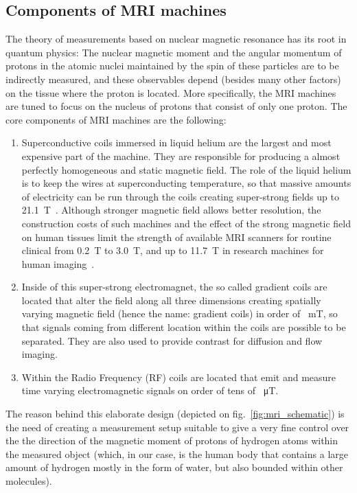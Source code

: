 \subsection{Components of MRI machines}
The theory of measurements based on nuclear magnetic resonance has its root in quantum physics: The nuclear magnetic moment and the angular momentum of protons in the atomic nuclei maintained by the spin of these particles are to be indirectly measured, and these observables depend (besides many other factors) on the tissue where the proton is located. More specifically, the MRI
machines are tuned to focus on the nucleus of protons that consist of only one proton. The core components of MRI machines are the following:
\begin{enumerate}
    \item Superconductive coils immersed in liquid helium are the largest and most expensive part of the machine. They are responsible for producing a almost perfectly homogeneous and static magnetic field. The role of the liquid helium is to keep the wires at superconducting temperature, so that massive amounts of electricity can be run through the coils creating super-strong fields up to \SI{21.1}{\tesla}~\cite{schepkin_vivo_2012}. Although stronger magnetic field allows better resolution, the construction costs of such machines and the effect of the strong magnetic field on human tissues limit the strength of available MRI scanners for routine clinical from \SI{0.2}{\tesla} to \SI{3.0}{\tesla}, and up to \SI{11.7}{\tesla} in research machines for human imaging~\cite{ladd_pros_2018}.
    \item Inside of this super-strong electromagnet, the so called gradient coils are located that alter the field along all three dimensions creating spatially varying magnetic field (hence the name: gradient coils) in order of \SI{}{\milli\tesla}, so that signals coming from different location within the coils are possible to be separated. They are also used to provide contrast for diffusion and flow imaging.
    \item Within the Radio Frequency (RF) coils are located that emit and measure time varying electromagnetic signals on order of tens of \SI{}{\micro\tesla}.
\end{enumerate}
The reason behind this elaborate design (depicted on fig.~\ref{fig:mri_schematic}) is the need of creating a measurement setup suitable to give a very fine control over the the direction of the magnetic moment of protons of hydrogen atoms within the measured object (which, in our case, is the human body that contains a large amount of hydrogen mostly in the form of water, but also bounded within other molecules).


